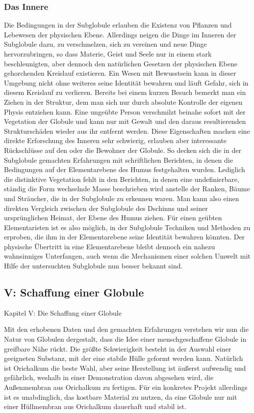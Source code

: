 \documentclass[a5paper,8pt]{book}
\begin{document}
\subsubsection{Das Innere}
Die Bedingungen in der Subglobule erlauben die Existenz von Pflanzen und Lebewesen der physischen Ebene. Allerdings neigen 
die Dinge im Inneren der Subglobule dazu, zu verschmelzen, sich zu vereinen und neue Dinge hervorzubringen, so dass Materie, 
Geist und Seele nur in einem stark beschleunigten, aber dennoch den natürlichen Gesetzen der physischen Ebene gehorchenden
Kreislauf existieren. Ein Wesen mit Bewusstsein kann in dieser Umgebung nicht ohne weiteres seine Identität bewahren und 
läuft Gefahr, sich in diesem Kreislauf zu verlieren. Bereits bei einem kurzen Besuch bemerkt man ein Ziehen in der Struktur, 
dem man sich nur durch absolute Kontrolle der eigenen Physis entziehen kann. Eine ungeübte Person verschmilzt beinahe sofort 
mit der Vegetation der Globule und kann nur mit Gewalt und den daraus resultierenden Strukturschäden wieder aus ihr entfernt werden. 
Diese Eigenschaften machen eine direkte Erforschung des Inneren sehr schwierig, erlauben aber interessante Rückschlüsse auf 
den oder die Bewohner der Globule. So decken sich die in der Subglobule gemachten Erfahrungen mit schriftlichen Berichten, 
in denen die Bedingungen auf der Elementarebene des Humus festgehalten wurden. Lediglich die distinktive Vegetation fehlt 
in den Berichten, in denen eine undefinierbare, ständig die Form wechselnde Masse beschrieben wird anstelle der Ranken, 
Bäume und Sträucher, die in der Subglobule zu erkennen waren. Man kann also einen direkten Vergleich zwischen der 
Subglobule des Dschinns und seiner ursprünglichen Heimat, der Ebene des Humus ziehen. Für einen geübten Elementaristen ist 
es also möglich, in der Subglobule Techniken und Methoden zu erproben, die ihm in der Elementarebene seine Identität 
bewahren könnten. Der physische Übertritt in eine Elementarebene bleibt dennoch ein nahezu wahnsinniges Unterfangen, auch 
wenn die Mechanismen einer solchen Umwelt mit Hilfe der untersuchten Subglobule nun besser bekannt sind. 

\newpage

\subsection{V: Schaffung einer Globule}

Kapitel V: Die Schaffung einer Globule

Mit den erhobenen Daten und den gemachten Erfahrungen verstehen wir nun die Natur von Globulen dergestalt, dass die Idee 
einer menschgeschaffene Globule in greifbare Nähe rückt. 
Die größte Schwierigkeit besteht in der Auswahl einer geeigneten Substanz, mit der eine stabile Hülle geformt werden kann. 
Natürlich ist Orichalkum die beste Wahl, aber seine Herstellung ist äußerst aufwendig und gefährlich, weshalb in einer 
Demonstration davon abgesehen wird, die Außenmembran aus Orichalkum zu fertigen. Für ein konkretes Projekt allerdings ist 
es unabdinglich, das kostbare Material zu nutzen, da eine Globule nur mit einer Hüllmembran aus Orichalkum dauerhaft und 
stabil ist. 
\end{document}
